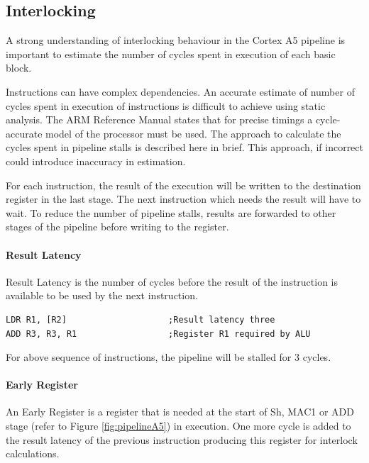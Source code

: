 \subsection{Interlocking}
A strong understanding of interlocking behaviour in the Cortex A5 pipeline is important to estimate the number of cycles spent in execution of each basic block. 

Instructions can have complex dependencies. An accurate estimate of number of cycles spent in execution of instructions is difficult to achieve using static analysis. The ARM Reference Manual \cite{CortexA5TRM} states that for precise timings a cycle-accurate model of the processor must be used. The approach to calculate the cycles spent in pipeline stalls is described here in brief. This approach, if incorrect could introduce inaccuracy in estimation.

For each instruction, the result of the execution will be written to the destination register in the last stage. The next instruction which needs the result will have to wait. To reduce the number of pipeline stalls, results are forwarded to other stages of the pipeline before writing to the register.

\vspace*{-10pt}
\paragraph{Result Latency}
Result Latency is the number of cycles before the result of the instruction is available to be used by the next instruction. 

\begin{Example}
\begin{lstlisting}
LDR R1, [R2]                    ;Result latency three
ADD R3, R3, R1                  ;Register R1 required by ALU
\end{lstlisting}
\end{Example}
\vspace*{-10pt}

For above sequence of instructions, the pipeline will be stalled for 3 cycles.

\vspace*{-10pt}
\paragraph{Early Register}
An Early Register is a register that is needed at the start of Sh, MAC1 or ADD stage (refer to Figure \ref{fig:pipelineA5}) in execution. One more cycle is added to the result latency of the previous instruction producing this register for interlock calculations.

